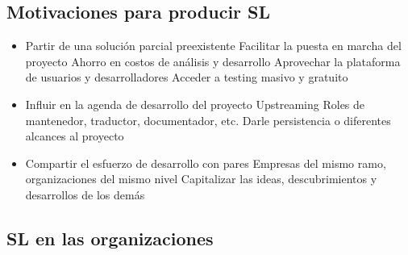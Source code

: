 \subsection {Motivaciones para producir SL}
\begin{itemize}
	\item Partir de una solución parcial preexistente
	\subitem Facilitar la puesta en marcha del proyecto
	\subitem Ahorro en costos de análisis y desarrollo
	\subitem Aprovechar la plataforma de usuarios y desarrolladores
	\subitem Acceder a testing masivo y gratuito
	\item Influir en la agenda de desarrollo del proyecto
	\subitem Upstreaming
	\subitem Roles de mantenedor, traductor, documentador, etc.
	\subitem Darle persistencia o diferentes alcances al proyecto
	\item Compartir el esfuerzo de desarrollo con pares
	\subitem Empresas del mismo ramo, organizaciones del mismo nivel
	\subitem Capitalizar las ideas, descubrimientos y desarrollos de los demás
\end{itemize}

\subsection {SL en las organizaciones}
